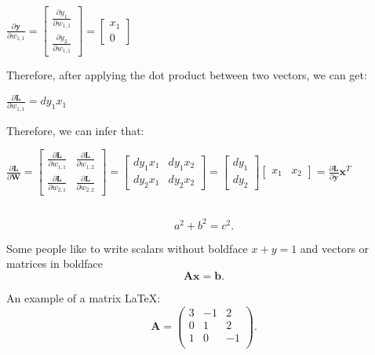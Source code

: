 \documentclass[12pt]{article}
\begin{document}
\begin{center}
    $
    \frac{\partial\textbf{y}}{\partial w_{1,1}}=
    \left[\begin{matrix}
    \frac{\partial y_{1}}{\partial w_{1,1}}\\
    \frac{\partial y_{2}}{\partial w_{1,1}}
    \end{matrix}\right]=
    \left[\begin{matrix}
    x_{1}\\
    0
    \end{matrix}\right]
    $
\end{center}Therefore, after applying the dot product between two vectors, we can get:
\begin{center}
    $
    \frac{\partial \textbf{L}}{\partial w_{1,1}} = 
    dy_{1}x_{1}
    $
\end{center}Therefore, we can infer that:
\begin{center}
    $\frac{\partial\textbf{L}}{\partial\textbf{W}} = 
    \left[\begin{matrix}
    \frac{\partial\textbf{L}}{\partial w_{1,1}} & \frac{\partial\textbf{L}}{\partial w_{1,2}}\\
    \frac{\partial\textbf{L}}{\partial w_{2,1}} & \frac{\partial\textbf{L}}{\partial w_{2,2}}
    \end{matrix}\right]=
    \left[\begin{matrix}
    dy_{1}x_{1} & dy_{1}x_{2}\\
    dy_{2}x_{1} & dy_{2}x_{2}
    \end{matrix}\right]=
    \left[\begin{matrix}
    dy_{1}\\
    dy_{2}
    \end{matrix}\right]
    \left[\begin{matrix}
    x_{1} & x_{2}
    \end{matrix}\right]=
    \frac{\partial\textbf{L}}{\partial\textbf{y}}\mathbf{x}^T
    $
\end{center}


\subsection*{}

\begin{equation*}
    a^2 + b^2 = c^2.
\end{equation*}

Some people like to write scalars without boldface $x+y=1$ and vectors or matrices in boldface
\begin{equation}
    \mathbf{A} \mathbf{x} = \mathbf{b}.
\end{equation}

An example of a matrix \LaTeX:
\begin{equation}
    \mathbf{A} = \left(
    \begin{array}{ccc}
    3 & -1 & 2 \\ 	
    0 & 1 & 2 \\ 
    1 & 0 & -1 \\
\end{array} 
\right).  
\end{equation}
\end{document}
